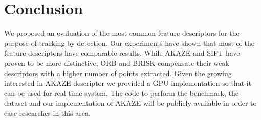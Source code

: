 \section{Conclusion}

We proposed an evaluation of the most common feature descriptors for the purpose of tracking by detection. Our experiments have shown that most of the feature descriptors have comparable results. While AKAZE and SIFT have proven to be more distinctive, ORB and BRISK compensate their weak descriptors with a higher number of points extracted. Given the growing interested in AKAZE descriptor we provided a GPU implementation so that it can be used for real time system. The code to perform the benchmark, the dataset and our implementation of AKAZE will be publicly available in order to ease researches in this area.


